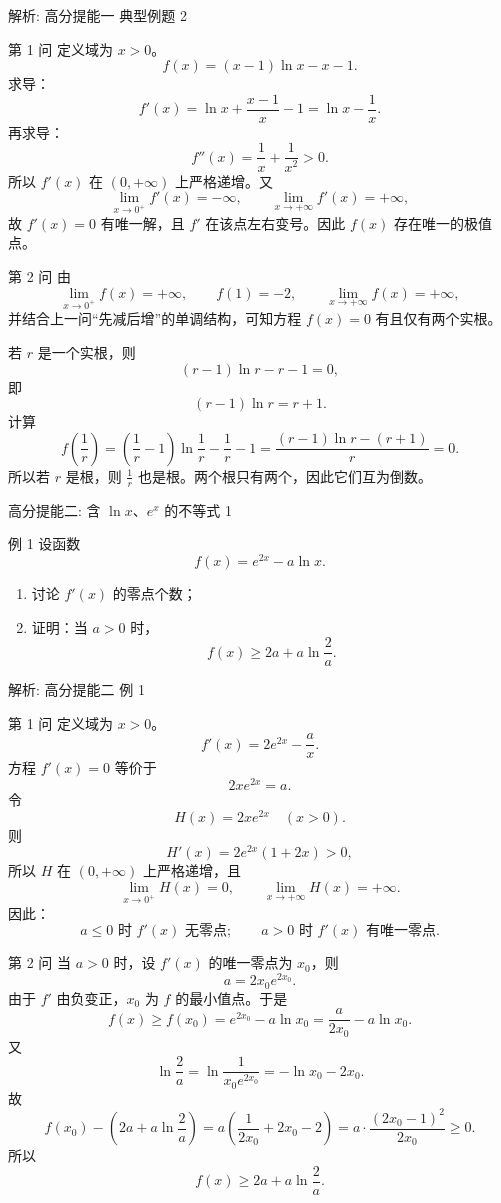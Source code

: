 ﻿\documentclass[aspectratio=169,10pt]{ctexbeamer}
\begin{document}
\begin{frame}[t,allowframebreaks]{解析: 高分提能一 典型例题 2}
\tiny
\begin{block}{第 1 问}
定义域为 $x>0$。
\[
f(x)=(x-1)\ln x-x-1.
\]
求导：
\[
f'(x)=\ln x+\frac{x-1}{x}-1=\ln x-\frac1x.
\]
再求导：
\[
f''(x)=\frac1x+\frac1{x^2}>0.
\]
所以 $f'(x)$ 在 $(0,+\infty)$ 上严格递增。又
\[
\lim_{x\to0^+}f'(x)=-\infty,\qquad \lim_{x\to+\infty}f'(x)=+\infty,
\]
故 $f'(x)=0$ 有唯一解，且 $f'$ 在该点左右变号。因此 $f(x)$ 存在唯一的极值点。
\end{block}
\begin{block}{第 2 问}
由
\[
\lim_{x\to0^+}f(x)=+\infty,\qquad f(1)=-2,\qquad \lim_{x\to+\infty}f(x)=+\infty,
\]
并结合上一问“先减后增”的单调结构，可知方程 $f(x)=0$ 有且仅有两个实根。

若 $r$ 是一个实根，则
\[
(r-1)\ln r-r-1=0,
\]
即
\[
(r-1)\ln r=r+1.
\]
计算
\[
f\left(\frac1r\right)
=\left(\frac1r-1\right)\ln\frac1r-\frac1r-1
=\frac{(r-1)\ln r-(r+1)}r=0.
\]
所以若 $r$ 是根，则 $\frac1r$ 也是根。两个根只有两个，因此它们互为倒数。
\end{block}
\end{frame}

\begin{frame}[t]{高分提能二: 含 $\ln x$、$e^x$ 的不等式 1}
\large
\begin{block}{例 1}
设函数
\[
f(x)=e^{2x}-a\ln x.
\]
\begin{enumerate}
  \item 讨论 $f'(x)$ 的零点个数；
  \item 证明：当 $a>0$ 时，
  \[
  f(x)\ge 2a+a\ln\frac{2}{a}.
  \]
\end{enumerate}
\end{block}
\end{frame}

\begin{frame}[t,allowframebreaks]{解析: 高分提能二 例 1}
\tiny
\begin{block}{第 1 问}
定义域为 $x>0$。
\[
f'(x)=2e^{2x}-\frac ax.
\]
方程 $f'(x)=0$ 等价于
\[
2xe^{2x}=a.
\]
令
\[
H(x)=2xe^{2x}\quad (x>0).
\]
则
\[
H'(x)=2e^{2x}(1+2x)>0,
\]
所以 $H$ 在 $(0,+\infty)$ 上严格递增，且
\[
\lim_{x\to0^+}H(x)=0,\qquad \lim_{x\to+\infty}H(x)=+\infty.
\]
因此：
\[
a\le0 \text{ 时 } f'(x) \text{ 无零点};\qquad
a>0 \text{ 时 } f'(x) \text{ 有唯一零点}.
\]
\end{block}
\begin{block}{第 2 问}
当 $a>0$ 时，设 $f'(x)$ 的唯一零点为 $x_0$，则
\[
a=2x_0e^{2x_0}.
\]
由于 $f'$ 由负变正，$x_0$ 为 $f$ 的最小值点。于是
\[
f(x)\ge f(x_0)=e^{2x_0}-a\ln x_0
=\frac a{2x_0}-a\ln x_0.
\]
又
\[
\ln\frac2a=\ln\frac1{x_0e^{2x_0}}=-\ln x_0-2x_0.
\]
故
\[
f(x_0)-\left(2a+a\ln\frac2a\right)
=a\left(\frac1{2x_0}+2x_0-2\right)
=a\cdot\frac{(2x_0-1)^2}{2x_0}\ge0.
\]
所以
\[
f(x)\ge 2a+a\ln\frac2a.
\]
\end{block}
\end{frame}
\end{document}
